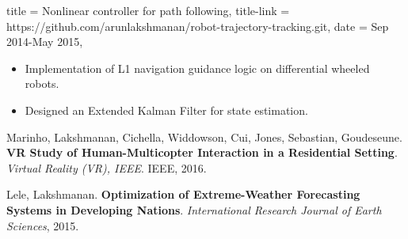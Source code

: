 \documentclass{simplecv}
\begin{document}
\begin{position}
  {
      title   = Nonlinear controller for path following,
      title-link = https://github.com/arunlakshmanan/robot-trajectory-tracking.git,
      date    = Sep 2014-May 2015,
  }

\begin{itemize}
    \item Implementation of L1 navigation guidance logic on differential wheeled robots.
    \item Designed an Extended Kalman Filter for state estimation. 

\end{itemize}
\end{position}

\renewcommand\refname{Publications}
\begin{thebibliography}{9}

    Marinho, Lakshmanan, Cichella, Widdowson, Cui, Jones, Sebastian, Goudeseune. 
    \textbf{VR Study of Human-Multicopter Interaction in a Residential Setting}. 
    \textit{Virtual Reality (VR), IEEE}. IEEE, 2016.

    Lele, Lakshmanan. 
    \textbf{Optimization of Extreme-Weather Forecasting Systems in Developing Nations}.
    \textit{International Research Journal of Earth Sciences}, 2015.
\end{thebibliography}
\vfill \vfill
\newpage
\end{document}
